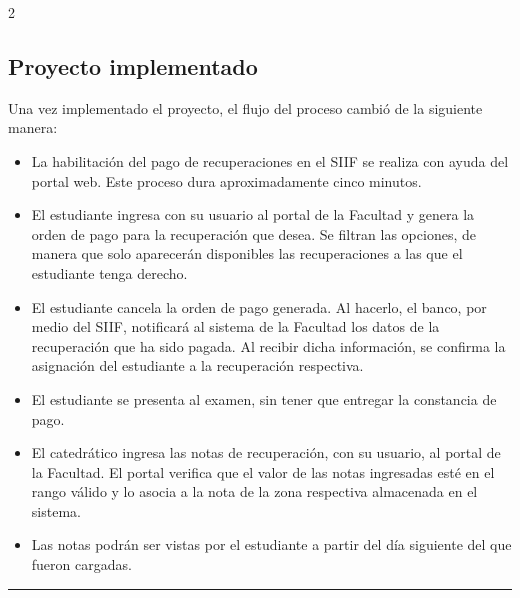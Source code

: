 \documentclass[11pt,spanish,Letterpaper,openany]{book}
\begin{document}
\begin {multicols}{2}

\hypertarget{proyecto-implementado}{%
\subsection{Proyecto implementado}\label{proyecto-implementado}}

Una vez implementado el proyecto, el flujo del proceso cambió de la siguiente manera:

\begin{itemize}
\item
  La habilitación del pago de recuperaciones en el SIIF se realiza con ayuda del portal web. Este proceso dura aproximadamente cinco minutos.
\item
  El estudiante ingresa con su usuario al portal de la Facultad y genera la orden de pago para la recuperación que desea. Se filtran las opciones, de manera que solo aparecerán disponibles las recuperaciones a las que el estudiante tenga derecho.
\item
  El estudiante cancela la orden de pago generada. Al hacerlo, el banco, por medio del SIIF, notificará al sistema de la Facultad los datos de la recuperación que ha sido pagada. Al recibir dicha información, se confirma la asignación del estudiante a la recuperación respectiva.
\item
  El estudiante se presenta al examen, sin tener que entregar la constancia de pago.
\item
  El catedrático ingresa las notas de recuperación, con su usuario, al portal de la Facultad. El portal verifica que el valor de las notas ingresadas esté en el rango válido y lo asocia a la nota de la zona respectiva almacenada en el sistema.
\item
  Las notas podrán ser vistas por el estudiante a partir del día siguiente del que fueron cargadas.
\end{itemize}

\end {multicols}

\begin{center}\rule{0.5\linewidth}{\linethickness}\end{center}
\end{document}
